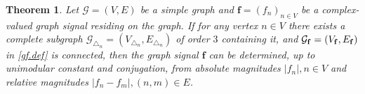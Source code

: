 \documentclass[12pt,oneside,reqno]{amsart}
\newtheorem{theorem}{Theorem}[section]
\newcommand{\Z}{\mathbb{Z}}
\newcommand{\R}{\mathbb{R}}
\numberwithin{equation}{section}
\begin{document}
	\begin{theorem}\label{connect.pr.suff.thm1}
		Let $\mathcal{G}=(V, E)$ be a simple graph and  $\mathbf{f}= (f_n)_{n\in V}$ be a complex-valued graph signal residing on the graph. If for any vertex  $n\in V$ there exists a complete subgraph $\mathcal{G}_{\triangle_n}=(V_{\triangle_n},E_{\triangle_n})$ of order $3$ containing it,  and $\mathcal{G}_{\bf f}=(V_{\bf f},E_{\bf f})$ in \eqref{gf.def} is connected, then the graph signal $\mathbf{f}$ can be determined, up to unimodular constant and conjugation, from absolute magnitudes $|f_n|, n\in V$ and relative magnitudes $|f_n-f_m|, (n, m)\in E$. %
	\end{theorem}
\end{document}
